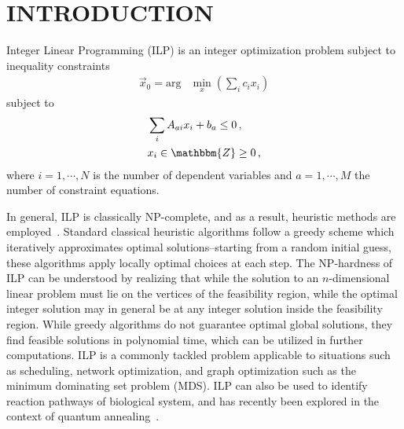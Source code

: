 \documentclass[prd,twocolumn,tightenlines,preprintnumbers,showpacs,superscriptaddress,notitlepage,nofootinbib,eqsecnum,floatfix,longbibliography,aps,10pt]{revtex4-1}
\begin{document}

\maketitle

\flushbottom
\maketitle

\section{INTRODUCTION}
\label{sec:introduction}
Integer Linear Programming (ILP) is an integer optimization problem subject to inequality constraints
\begin{align}
 \label{eq:initial-ip-def}
 \vec x_0 = \mathrm{arg} & \min\limits_{x}\left(\sum_i c_i x_i\right)
\end{align}
subject to
\begin{align}
 \label{eq:ilp-constraints}
  & \sum_i A_{ai}x_i +b_a \leq 0 \,, \\
  & x_i  \in \mathbbm{Z} \geq 0\, ,
\end{align}
where $i=1, \cdots,  N$ is the number of dependent variables and $a=1, \cdots, M$ the number of constraint equations.

In general, ILP is classically NP-complete, and as a result, heuristic methods are employed~\cite{GLOVER1986533, doi:10.1287/ijoc.1.3.190, doi:10.1287/ijoc.2.1.4}.
Standard classical heuristic algorithms follow a greedy scheme which iteratively approximates optimal solutions--starting from a random initial guess, these algorithms apply locally optimal choices at each step.
The NP-hardness of ILP can be understood by realizing that while the solution to an $n$-dimensional linear problem must lie on the vertices of the feasibility region, while the optimal integer solution may in general be at any integer solution inside the feasibility region.
While greedy algorithms do not guarantee optimal global solutions, they find feasible solutions in polynomial time, which can be utilized in further computations. ILP is a commonly tackled problem applicable to situations such as scheduling, network optimization, and graph optimization such as the minimum dominating set problem (MDS). ILP can also be used to identify reaction pathways of biological system, and has recently been explored in the context of quantum annealing~\cite{2020arXiv200713788H}.
\end{document}

